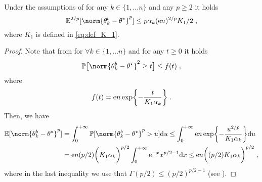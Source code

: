 \begin{corollary}
\label{cor: last_iter_boot_p_moment}
Under the assumptions of 
for any $ k\in\{1,\ldots n\}$ and any $p\geq 2$ it holds 
\begin{equation}
     \PE^{2/p}[\norm{\theta_k^b - \thetas}^{p}] \leq p \alpha_k(\rme n)^{2/p} K_1/2 \eqsp,
\end{equation}
where $K_1$ is defined in \eqref{eq:def_K_1}.
\end{corollary}
\begin{proof}
Note that from  for $\forall k\in\{1,\ldots n\}$ and for any $t\geq 0$ it holds 
    \begin{equation}
    \PP\bigl[\norm{\theta_k^b - \thetas}^2 \geq t\bigr]\leq f(t)\eqsp,
\end{equation}
where 
\[
f(t) = \mathrm{e} n\exp\biggl\{-\frac{t}{K_1\alpha_k}\biggr\}\;.
\]
Then, we have 
\begin{align}
    \PE[\norm{\theta_k^b - \thetas}^{p}] &= \int_{0}^{+\infty}\PP[\norm{\theta_k^b - \thetas}^{p} > u]\rmd u \leq\int_{0}^{+\infty}\rme n\exp\biggl\{-\frac{u^{2/p}}{K_1\alpha_k}\biggr\}\rmd u \\&=\rme n(p/2)\biggl(K_1\alpha_k\biggr)^{p/2}\int_{0}^{+\infty}\rme^{-x}x^{p/2-1}\rmd x \leq\rme n\biggl((p/2)K_1\alpha_k\biggr)^{p/2}\eqsp,
\end{align}
where in the last inequality we use that $\Gamma(p/2) \leq (p/2)^{p/2 -1}$ (see \cite[Theorem 1.5]{AndersonGammaFunc}).
\end{proof}

